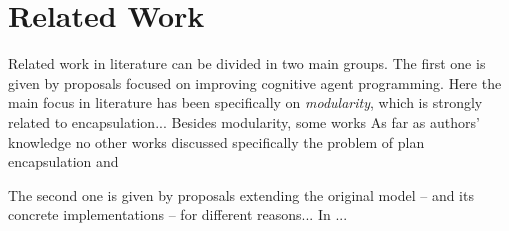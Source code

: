 \section{Related Work}
\label{sec:related}

Related work in literature can be divided in two main groups.
%
%
The first one is given by proposals focused on improving cognitive agent programming.
%
%
Here the main focus in literature has been specifically on \emph{modularity}, which is strongly related to encapsulation...
%
%
Besides modularity, some works
As far as authors' knowledge no other works discussed specifically the problem of plan encapsulation and 

%
%
The second one is given by proposals extending the original {\asl} model -- and its concrete implementations -- for different reasons...
%
In \cite{}...
